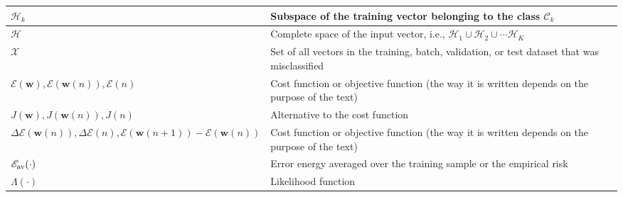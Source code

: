 \documentclass{article}
\begin{document}
\begin{xltabular}{\textwidth}{XX}
	\(\mathscr{H}_k\)                                                                                                     & Subspace of the training vector belonging to the class \(\mathscr{C}_k\)                                                                                                                                                     \\ \hline
	\(\mathscr{H}\)                                                                                                       & Complete space of the input vector, i.e., \(\mathscr{H}_1 \cup \mathscr{H}_2 \cup \cdots \mathscr{H}_K \)                                                                                                                    \\ \hline
    \(\mathscr{X}\) \cite{haykinNeuralNetworksLearning2009} & Set of all vectors in the training, batch, validation, or test dataset that was misclassified \\ \hline
	\(\mathscr{E}(\mathbf{w}), \mathscr{E}(\mathbf{w}(n)), \mathscr{E}(n)\)                                               & Cost function or objective function (the way it is written depends on the purpose of the text)                                                                                                                               \\ \hline
	\(J(\mathbf{w}), J(\mathbf{w}(n)), J(n)\)                                                                             & Alternative to the cost function                                                                                                                                                                                             \\ \hline
	\(\Delta\mathscr{E}(\mathbf{w}(n)), \Delta\mathscr{E}(n), \mathscr{E}(\mathbf{w}(n+1)) - \mathscr{E}(\mathbf{w}(n))\) & Cost function or objective function (the way it is written depends on the purpose of the text)                                                                                                                               \\ \hline
	\(\mathscr{E}_{\textnormal{av}}(\cdot)\)                                                                              & Error energy averaged over the training sample or the empirical risk  \cite{bishopPatternRecognitionMachine2006}                                                                                                             \\ \hline
	\(\Lambda(\cdot)\)                                                                                                    & Likelihood function                                                                                                                                                                                                          \\ \hline

\end{xltabular}
\end{document}
